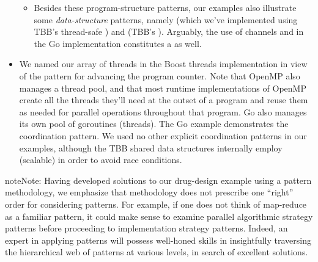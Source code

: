 \documentclass[letterpaper,10pt,openany,oneside]{sphinxmanual}
\begin{document}
\begin{itemize}
\begin{itemize}
\item {} 
Besides these program-structure patterns, our examples also illustrate some \emph{data-structure} patterns, namely  (which we’ve implemented using TBB’s thread-safe ) and  (TBB’s ). Arguably, the use of channels  and  in the Go implementation constitutes a  as well.

\end{itemize}

\item {} 
We named our array of threads  in the Boost threads implementation in view of the  pattern for advancing the program counter. Note that OpenMP also manages a thread pool, and that most runtime implementations of OpenMP create all the threads they’ll need at the outset of a program and reuse them as needed for parallel operations throughout that program. Go also manages its own pool of goroutines (threads). The Go example demonstrates the  coordination pattern. We used no other explicit coordination patterns in our examples, although the TBB shared data structures internally employ (scalable)  in order to avoid race conditions.

\end{itemize}

\begin{notice}{note}{Note:}
Having developed solutions to our drug-design example using a pattern methodology, we emphasize that methodology does not prescribe one “right” order for considering patterns. For example, if one does not think of map-reduce as a familiar pattern, it could make sense to examine parallel algorithmic strategy patterns before proceeding to implementation strategy patterns. Indeed, an expert in applying patterns will possess well-honed skills in insightfully traversing the hierarchical web of patterns at various levels, in search of excellent solutions.
\end{notice}



\renewcommand{\indexname}{Index}
\printindex
\end{document}
